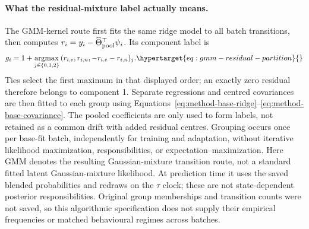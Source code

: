 \paragraph{What the residual-mixture label actually means.}
\label{sec:residual-mixture-fit}\hypertarget{sec:residual-mixture-fit}{}
The GMM-kernel route first fits the same ridge model to all batch transitions,
then computes \(r_i=y_i-\widehat\Theta_{\rm pool}^\top\psi_i\). Its component
label is
\begin{align}
 g_i=1+\underset{j\in\{0,1,2\}}{\operatorname{argmax}}\,
       (r_{i,e},r_{i,n},-r_{i,e}-r_{i,n})_j .
 \label{eq:gmm-residual-partition}\hypertarget{eq:gmm-residual-partition}{}
\end{align}
Ties select the first maximum in that displayed order; an exactly zero
residual therefore belongs to component 1. Separate regressions and centred
covariances are then fitted to each group using
Equations~\eqref{eq:method-base-ridge}--\eqref{eq:method-base-covariance}.
The pooled coefficients are only used to form labels, not retained as a
common drift with added residual centres. Grouping occurs once per base-fit
batch, independently for training and adaptation, without iterative
likelihood maximization, responsibilities, or expectation--maximization.
Here GMM denotes the resulting Gaussian-mixture transition route, not a
standard fitted latent Gaussian-mixture likelihood. At prediction time it
uses the saved blended probabilities and redraws on the \(\tau\) clock;
these are not state-dependent posterior responsibilities. Original group
memberships and transition counts were not saved, so this algorithmic
specification does not supply their empirical frequencies or matched
behavioural regimes across batches.

